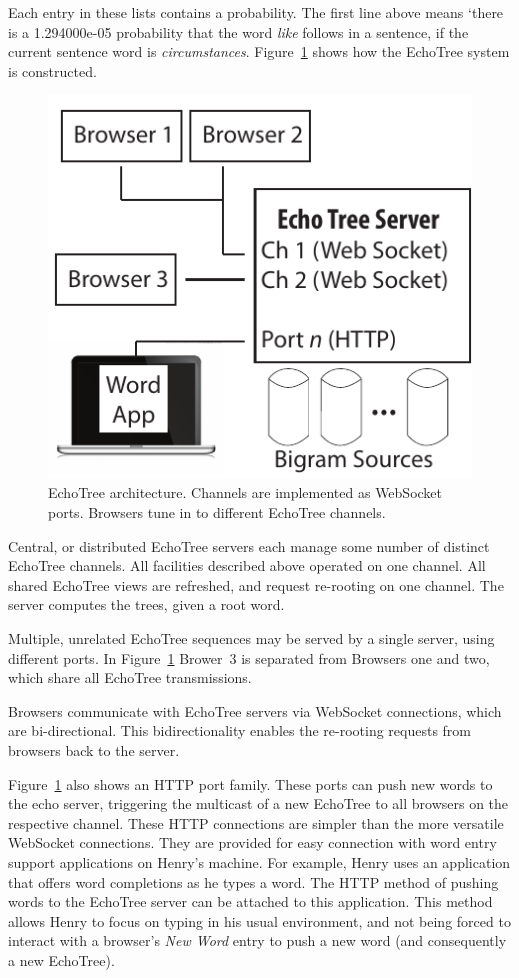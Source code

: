 \documentclass{sigchi}
\begin{document}
Each entry in these lists contains a probability. The first line
above means `there is a 1.294000e-05 probability that the word {\em
  like} follows in a sentence, if the current sentence word is {\em
  circumstances}. 
Figure~\ref{fig:arch} shows how the EchoTree system is
constructed. 
\begin{figure}
   \centering
   \includegraphics[width=0.5\columnwidth]{Figs/echoTreeArch.pdf}
   \caption{EchoTree architecture. Channels are implemented as
     WebSocket ports. Browsers tune in to different EchoTree channels.}
   \label{fig:arch}
\end{figure}
Central, or distributed EchoTree servers each manage some
number of distinct EchoTree channels. All facilities described above
operated on one channel. All shared EchoTree views are refreshed, and
request re-rooting on one channel. The server computes the trees,
given a root word.

Multiple, unrelated EchoTree sequences may be served by a single
server, using different ports. In Figure~\ref{fig:arch}
Brower~3 is separated from Browsers one and two, which share all
EchoTree transmissions.

Browsers communicate with EchoTree servers via WebSocket connections,
which are bi-directional. This bidirectionality enables the re-rooting
requests from browsers back to the server.

Figure~\ref{fig:arch} also shows an HTTP port family. These ports can
push new words to the echo server, triggering the multicast of a new
EchoTree to all browsers on the respective channel. These HTTP
connections are simpler than the more versatile WebSocket
connections. They are provided for easy connection with word entry
support applications on Henry's machine. For example, Henry uses an
application that offers word completions as he types a word. The HTTP
method of pushing words to the EchoTree server can be attached to this
application. This method allows Henry to focus on typing in his usual
environment, and not being forced to interact with a browser's {\em
  New Word} entry to push a new word (and consequently a new
EchoTree).
\end{document}

